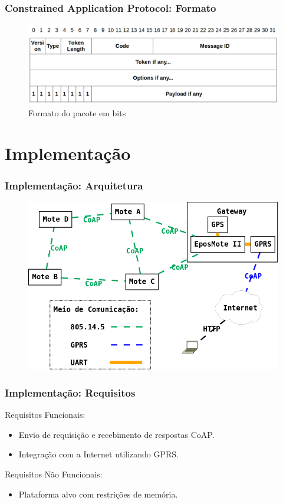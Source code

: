 \documentclass{beamer}
\begin{document}
\begin{frame}
\frametitle{Constrained Application Protocol: Formato}
\begin{figure}
\includegraphics[width=1.0\linewidth]{../figuras/formato}
\caption{Formato do pacote em bits}
\end{figure}
\end{frame}

\section{Implementação}

\begin{frame}
\frametitle{Implementação: Arquitetura}
\begin{figure}
\includegraphics[width=0.9\linewidth]{../figuras/arquiteturaSlide}
\end{figure}
\end{frame}

\begin{frame}
\frametitle{Implementação: Requisitos}
Requisitos Funcionais:
\begin{itemize}
    \item Envio de requisição e recebimento de respostas CoAP.
    \item Integração com a Internet utilizando GPRS. 
\end{itemize}
Requisitos Não Funcionais:
\begin{itemize}
    \item Plataforma alvo com restrições de memória.
\end{itemize}
\end{frame}
\end{document}
